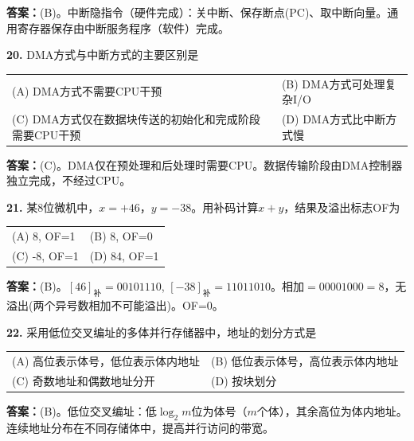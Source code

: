 \ifshowsolutions\par\noindent\textbf{答案：}(B)。中断隐指令（硬件完成）：关中断、保存断点(PC)、取中断向量。通用寄存器保存由中断服务程序（软件）完成。\else \answerarea \fi

\vspace{6pt}

\noindent\textbf{20.} DMA方式与中断方式的主要区别是
\begin{center}
\begin{tabularx}{0.94\linewidth}{@{}X X@{}}
(A) DMA方式不需要CPU干预 & (B) DMA方式可处理复杂I/O \\[6pt]
(C) DMA方式仅在数据块传送的初始化和完成阶段需要CPU干预 & (D) DMA方式比中断方式慢
\end{tabularx}
\end{center}

\ifshowsolutions\par\noindent\textbf{答案：}(C)。DMA仅在预处理和后处理时需要CPU。数据传输阶段由DMA控制器独立完成，不经过CPU。\else \answerarea \fi

\vspace{6pt}

\noindent\textbf{21.} 某8位微机中，$x=+46$，$y=-38$。用补码计算$x+y$，结果及溢出标志OF为
\begin{center}
\begin{tabular}{ll}
(A) 8, OF=1 & (B) 8, OF=0 \\[6pt]
(C) -8, OF=1 & (D) 84, OF=1
\end{tabular}
\end{center}

\ifshowsolutions\par\noindent\textbf{答案：}(B)。$[46]_{\text{补}}=00101110$, $[-38]_{\text{补}}=11011010$。相加$=00001000=8$，无溢出(两个异号数相加不可能溢出)。OF=0。\else \answerarea \fi

\vspace{6pt}

\noindent\textbf{22.} 采用低位交叉编址的多体并行存储器中，地址的划分方式是
\begin{center}
\begin{tabular}{ll}
(A) 高位表示体号，低位表示体内地址 & (B) 低位表示体号，高位表示体内地址 \\[6pt]
(C) 奇数地址和偶数地址分开 & (D) 按块划分
\end{tabular}
\end{center}

\ifshowsolutions\par\noindent\textbf{答案：}(B)。低位交叉编址：低$\log_2m$位为体号（$m$个体），其余高位为体内地址。连续地址分布在不同存储体中，提高并行访问的带宽。\else \answerarea \fi

